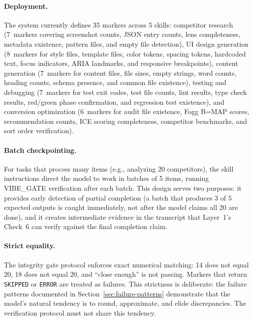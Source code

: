 \paragraph{Deployment.}
The system currently defines 35 markers across 5 skills: competitor research (7~markers covering screenshot counts, JSON entry counts, lens completeness, metadata existence, pattern files, and empty file detection), UI design generation (8~markers for style files, template files, color tokens, spacing tokens, hardcoded text, focus indicators, ARIA landmarks, and responsive breakpoints), content generation (7~markers for content files, file sizes, empty strings, word counts, heading counts, schema presence, and common file existence), testing and debugging (7~markers for test exit codes, test file counts, lint results, type check results, red/green phase confirmation, and regression test existence), and conversion optimization (6~markers for audit file existence, Fogg B=MAP scores, recommendation counts, ICE scoring completeness, competitor benchmarks, and sort order verification).

\paragraph{Batch checkpointing.}
For tasks that process many items (e.g., analyzing 20 competitors), the skill instructions direct the model to work in batches of 5 items, running VIBE\_GATE verification after each batch.
This design serves two purposes: it provides early detection of partial completion (a batch that produces 3 of 5 expected outputs is caught immediately, not after the model claims all 20 are done), and it creates intermediate evidence in the transcript that Layer~1's Check~6 can verify against the final completion claim.

\paragraph{Strict equality.}
The integrity gate protocol enforces exact numerical matching: 14 does not equal 20, 18 does not equal 20, and ``close enough'' is not passing.
Markers that return \texttt{SKIPPED} or \texttt{ERROR} are treated as failures.
This strictness is deliberate: the failure patterns documented in Section~\ref{sec:failure-patterns} demonstrate that the model's natural tendency is to round, approximate, and elide discrepancies.
The verification protocol must not share this tendency.


